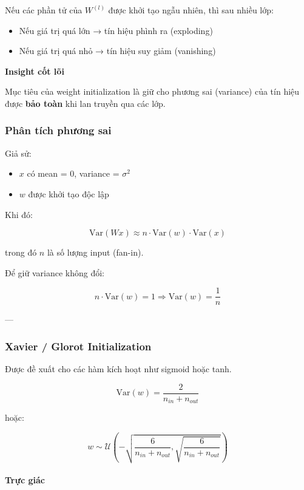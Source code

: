 Nếu các phần tử của $W^{(l)}$ được khởi tạo ngẫu nhiên, thì sau nhiều lớp:

\begin{itemize}
	\item Nếu giá trị quá lớn → tín hiệu phình ra (exploding)
	\item Nếu giá trị quá nhỏ → tín hiệu suy giảm (vanishing)
\end{itemize}

\begin{mdframed}[style=infobox]
	\textbf{Insight cốt lõi}
	
	Mục tiêu của weight initialization là giữ cho phương sai (variance) của tín hiệu được \textbf{bảo toàn} khi lan truyền qua các lớp.
\end{mdframed}

\subsubsection*{Phân tích phương sai}

Giả sử:
\begin{itemize}
	\item $x$ có mean = 0, variance = $\sigma^2$
	\item $w$ được khởi tạo độc lập
\end{itemize}

Khi đó:

\[
\text{Var}(Wx) \approx n \cdot \text{Var}(w) \cdot \text{Var}(x)
\]

trong đó $n$ là số lượng input (fan-in).

Để giữ variance không đổi:

\[
n \cdot \text{Var}(w) = 1
\Rightarrow \text{Var}(w) = \frac{1}{n}
\]

---

\subsubsection{Xavier / Glorot Initialization}

Được đề xuất cho các hàm kích hoạt như sigmoid hoặc tanh.

\[
\text{Var}(w) = \frac{2}{n_{in} + n_{out}}
\]

hoặc:

\[
w \sim \mathcal{U}\left(-\sqrt{\frac{6}{n_{in}+n_{out}}, \sqrt{\frac{6}{n_{in}+n_{out}}}}\right)
\]

\paragraph{Trực giác}

